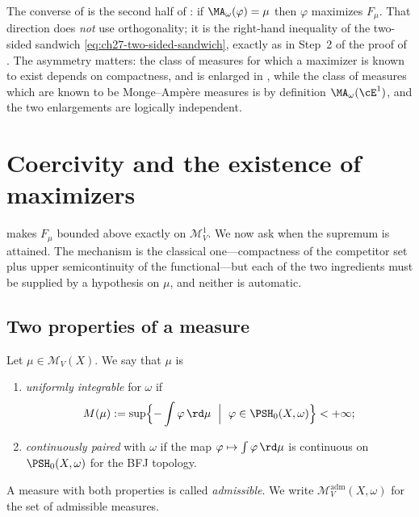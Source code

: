 \begin{remark}
\label{rem:ch28-converse-direction}
The converse of  is the second half
of : if $\MA_\omega(\varphi)=\mu$ then
$\varphi$ maximizes $F_\mu$.  That direction does \emph{not} use
orthogonality; it is the right-hand inequality of the two-sided sandwich
\eqref{eq:ch27-two-sided-sandwich}, exactly as in Step~2 of the proof of
.  The asymmetry matters: the class of
measures for which a maximizer is known to exist depends on compactness, and
is enlarged in , while the class of measures which
are known to be Monge--Amp\`ere measures is by definition
$\MA_\omega(\cE^1)$, and the two enlargements are logically independent.
\end{remark}

\section{Coercivity and the existence of maximizers}
\label{sec:ch28-coercivity}

 makes $F_\mu$ bounded above exactly on
$\mathcal M^1_V$.  We now ask when the supremum is attained.  The
mechanism is the classical one---compactness of the competitor set plus
upper semicontinuity of the functional---but each of the two ingredients
must be supplied by a hypothesis on $\mu$, and neither is automatic.

\subsection{Two properties of a measure}
\label{sec:ch28-two-properties}

\begin{definition}
\label{def:ch28-admissible-measure}
Let $\mu\in\mathcal M_V(X)$.  We say that $\mu$ is
\begin{enumerate}
\item\label{itm:ch28-adm:coercive}
 \emph{uniformly integrable} for $\omega$ if
 \begin{equation}
 \label{eq:ch28-uniform-integrability}
  M(\mu):=\sup\Bigl\{-\int\varphi\,\rd\mu\ \Bigm|\
   \varphi\in\PSH_0(X,\omega)\Bigr\}<+\infty ;
 \end{equation}
\item\label{itm:ch28-adm:paired}
 \emph{continuously paired} with $\omega$ if the map
 $\varphi\mapsto\int\varphi\,\rd\mu$ is continuous on
 $\PSH_0(X,\omega)$ for the BFJ topology.
\end{enumerate}
A measure with both properties is called \emph{admissible}.  We write
$\mathcal M^{\mathrm{adm}}_V(X,\omega)$ for the set of admissible
measures.
\end{definition}

